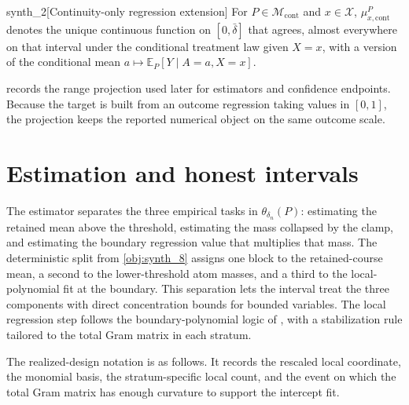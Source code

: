 \documentclass[11pt]{article}
\begin{document}
\begin{definitionv}{synth_2}[Continuity-only regression extension]
For \(P\in\mathcal M_{\mathrm{cont}}\) and \(x\in\mathcal X\), \(\mu_{x,\mathrm{cont}}^P\) denotes the unique continuous function on \([0,\bar\delta]\) that agrees, almost everywhere on that interval under the conditional treatment law given \(X=x\), with a version of the conditional mean \(a\mapsto\mathbb E_P[Y\mid A=a,X=x]\).
\end{definitionv}

 records the range projection used later for estimators and confidence endpoints. Because the target is built from an outcome regression taking values in \([0,1]\), the projection keeps the reported numerical object on the same outcome scale.


\section{Estimation and honest intervals}
\label{sec:estimation-intervals}

The estimator separates the three empirical tasks in \(\theta_{\delta_n}(P)\): estimating the retained mean above the threshold, estimating the mass collapsed by the clamp, and estimating the boundary regression value that multiplies that mass. The deterministic split from \cref{obj:synth_8} assigns one block to the retained-course mean, a second to the lower-threshold atom masses, and a third to the local-polynomial fit at the boundary. This separation lets the interval treat the three components with direct concentration bounds for bounded variables. The local regression step follows the boundary-polynomial logic of \citet{Fan1996}, with a stabilization rule tailored to the total Gram matrix in each stratum.

The realized-design notation is as follows. It records the rescaled local coordinate, the  monomial basis, the stratum-specific local count, and the event on which the total Gram matrix has enough curvature to support the intercept fit.
\end{document}
